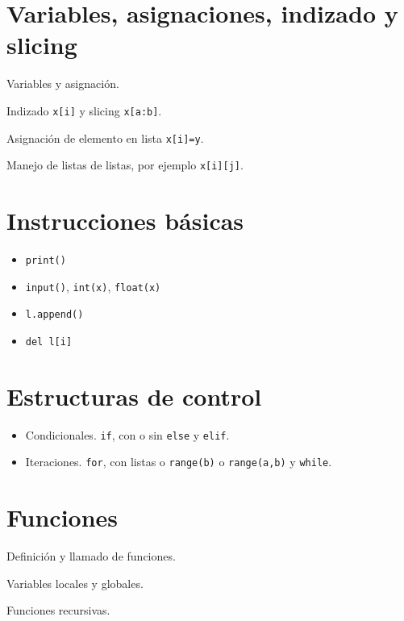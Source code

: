 \documentclass[a4paper, 12pt]{article}
\theoremstyle{definition}
\begin{document}
\section{Variables, asignaciones, indizado y slicing}
Variables y asignación.

Indizado {\tt x[i]} y slicing {\tt x[a:b]}. 

Asignación de elemento en lista {\tt x[i]=y}.

Manejo de listas de listas, por ejemplo {\tt x[i][j]}.

\section{Instrucciones básicas}

\begin{itemize}
	\item {\tt print()}
	\item {\tt input()}, {\tt int(x)}, {\tt float(x)}
	\item {\tt l.append()}
	\item {\tt del l[i]}
	
\end{itemize}

\section{Estructuras de control}
\begin{itemize}
	\item Condicionales. {\tt if}, con o sin {\tt else} y {\tt elif}.
	\item Iteraciones. {\tt for}, con listas o {\tt range(b)} o {\tt range(a,b)} y {\tt while}.
\end{itemize}

\section{Funciones}

Definición y llamado de funciones.

Variables locales y globales.

Funciones recursivas.
\end{document}
